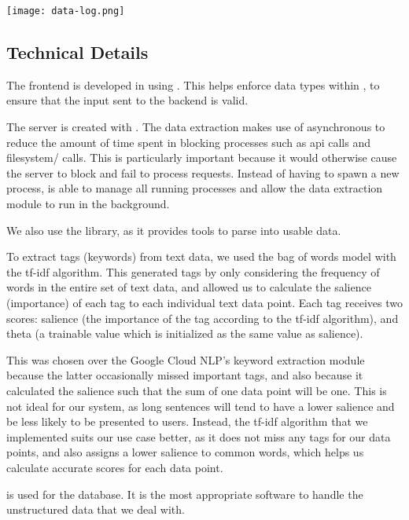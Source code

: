 \begin{center}
    \texttt{[image: data-log.png]}
\end{center}

\subsection{Technical Details}
The frontend is developed in  using . This helps enforce data types within , to ensure that the input sent to the backend is valid.

The server is created with . The data extraction makes use of asynchronous  to reduce the amount of time spent in blocking processes such as api calls and filesystem/ calls. This is particularly important because it would otherwise cause the server to block and fail to process requests. Instead of having to spawn a new process,  is able to manage all running processes and allow the data extraction module to run in the background.

We also use the  library, as it provides tools to parse  into usable data.

To extract tags (keywords) from text data, we used the bag of words model with the tf-idf algorithm. This generated tags by only considering the frequency of words in the entire set of text data, and allowed us to calculate the salience (importance) of each tag to each individual text data point. Each tag receives two scores: salience (the importance of the tag according to the tf-idf algorithm), and theta (a trainable value which is initialized as the same value as salience).

This was chosen over the Google Cloud NLP's keyword extraction module because the latter occasionally missed important tags, and also because it calculated the salience such that the sum of one data point will be one. This is not ideal for our system, as long sentences will tend to have a lower salience and be less likely to be presented to users. Instead, the tf-idf algorithm that we implemented suits our use case better, as it does not miss any tags for our data points, and also assigns a lower salience to common words, which helps us calculate accurate scores for each data point.


 is used for the database. It is the most appropriate software to handle the unstructured data that we deal with.

\newpage
